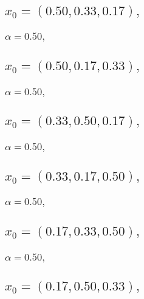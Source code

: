 \documentclass[a4paper]{article}
\begin{document}
\begin{multicols*}{2}
   \subsection{\(x_0 = (0.50,0.33,0.17),\quad \)}
   

   \subsubsection{\(\alpha = 0.50,\quad \)}
   

   \subsection{\(x_0 = (0.50,0.17,0.33),\quad \)}
   

   \subsubsection{\(\alpha = 0.50,\quad \)}
   

   \subsection{\(x_0 = (0.33,0.50,0.17),\quad \)}
   

   \subsubsection{\(\alpha = 0.50,\quad \)}
   

   \subsection{\(x_0 = (0.33,0.17,0.50),\quad \)}
   

   \subsubsection{\(\alpha = 0.50,\quad \)}
   

   \subsection{\(x_0 = (0.17,0.33,0.50),\quad \)}
   

   \subsubsection{\(\alpha = 0.50,\quad \)}
   

   \subsection{\(x_0 = (0.17,0.50,0.33),\quad \)}
   


\end{multicols*}
\end{document}
